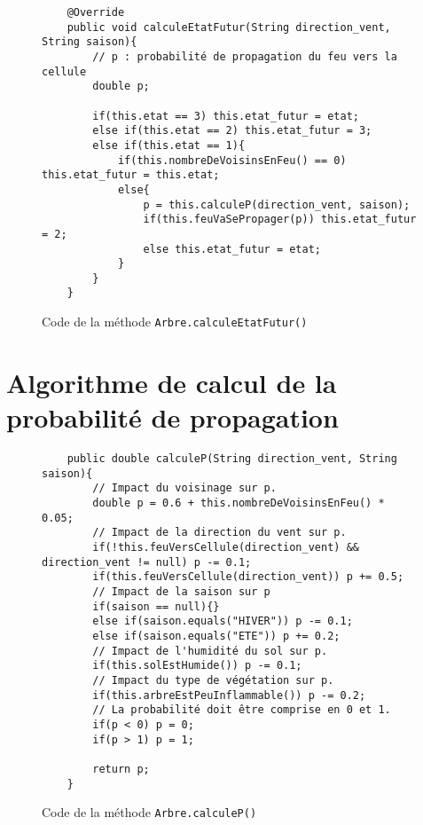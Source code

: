 \begin{figure}[htbp]
    \centering
    \begin{lstlisting}
    @Override
    public void calculeEtatFutur(String direction_vent, String saison){
        // p : probabilité de propagation du feu vers la cellule
        double p;

        if(this.etat == 3) this.etat_futur = etat;
        else if(this.etat == 2) this.etat_futur = 3;
        else if(this.etat == 1){
            if(this.nombreDeVoisinsEnFeu() == 0) this.etat_futur = this.etat;
            else{
                p = this.calculeP(direction_vent, saison);
                if(this.feuVaSePropager(p)) this.etat_futur = 2;
                else this.etat_futur = etat;
            }
        }
    }
    \end{lstlisting}
    \caption{Code de la méthode \texttt{Arbre.calculeEtatFutur()}}
    \label{fig:calculEtatFutur}
\end{figure}
\newpage
\section{Algorithme de calcul de la probabilité de propagation}
\label{sec:annexe5}

\begin{figure}[htbp]
    \centering
    \begin{lstlisting}
    public double calculeP(String direction_vent, String saison){
        // Impact du voisinage sur p.
        double p = 0.6 + this.nombreDeVoisinsEnFeu() * 0.05;
        // Impact de la direction du vent sur p.
        if(!this.feuVersCellule(direction_vent) && direction_vent != null) p -= 0.1;
        if(this.feuVersCellule(direction_vent)) p += 0.5;
        // Impact de la saison sur p
        if(saison == null){}
        else if(saison.equals("HIVER")) p -= 0.1;
        else if(saison.equals("ETE")) p += 0.2;
        // Impact de l'humidité du sol sur p.
        if(this.solEstHumide()) p -= 0.1;
        // Impact du type de végétation sur p.
        if(this.arbreEstPeuInflammable()) p -= 0.2;
        // La probabilité doit être comprise en 0 et 1.
        if(p < 0) p = 0;
        if(p > 1) p = 1;
        
        return p;
    }
    \end{lstlisting}
    \caption{Code de la méthode \texttt{Arbre.calculeP()}}
    \label{fig:calculProbaPropagation}
\end{figure}

